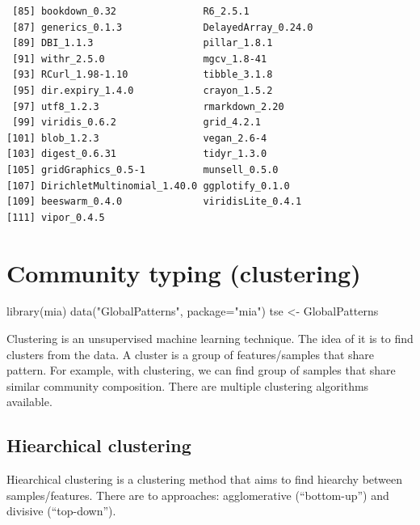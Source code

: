 \documentclass[
]{book}
\newenvironment{Shaded}{\begin{snugshade}}{\end{snugshade}}
\newcommand{\AttributeTok}[1]{\textcolor[rgb]{0.77,0.63,0.00}{#1}}
\newcommand{\FunctionTok}[1]{\textcolor[rgb]{0.00,0.00,0.00}{#1}}
\newcommand{\NormalTok}[1]{#1}
\newcommand{\OtherTok}[1]{\textcolor[rgb]{0.56,0.35,0.01}{#1}}
\newcommand{\StringTok}[1]{\textcolor[rgb]{0.31,0.60,0.02}{#1}}
\begin{document}
\begin{verbatim}
 [85] bookdown_0.32               R6_2.5.1                   
 [87] generics_0.1.3              DelayedArray_0.24.0        
 [89] DBI_1.1.3                   pillar_1.8.1               
 [91] withr_2.5.0                 mgcv_1.8-41                
 [93] RCurl_1.98-1.10             tibble_3.1.8               
 [95] dir.expiry_1.4.0            crayon_1.5.2               
 [97] utf8_1.2.3                  rmarkdown_2.20             
 [99] viridis_0.6.2               grid_4.2.1                 
[101] blob_1.2.3                  vegan_2.6-4                
[103] digest_0.6.31               tidyr_1.3.0                
[105] gridGraphics_0.5-1          munsell_0.5.0              
[107] DirichletMultinomial_1.40.0 ggplotify_0.1.0            
[109] beeswarm_0.4.0              viridisLite_0.4.1          
[111] vipor_0.4.5                
\end{verbatim}

\hypertarget{clustering}{%
\chapter{Community typing (clustering)}\label{clustering}}

\begin{Shaded}
\begin{Highlighting}[]
\FunctionTok{library}\NormalTok{(mia)}
\FunctionTok{data}\NormalTok{(}\StringTok{"GlobalPatterns"}\NormalTok{, }\AttributeTok{package=}\StringTok{"mia"}\NormalTok{)}
\NormalTok{tse }\OtherTok{\textless{}{-}}\NormalTok{ GlobalPatterns}
\end{Highlighting}
\end{Shaded}

Clustering is an unsupervised machine learning technique. The idea of it is to find
clusters from the data. A cluster is a group of features/samples that share pattern.
For example, with clustering, we can find group of samples that share similar
community composition. There are multiple clustering algorithms available.

\hypertarget{hiearchical-clustering}{%
\section{Hiearchical clustering}\label{hiearchical-clustering}}

Hiearchical clustering is a clustering method that aims to find hiearchy between
samples/features. There are to approaches: agglomerative (``bottom-up'')
and divisive (``top-down'').
\end{document}
